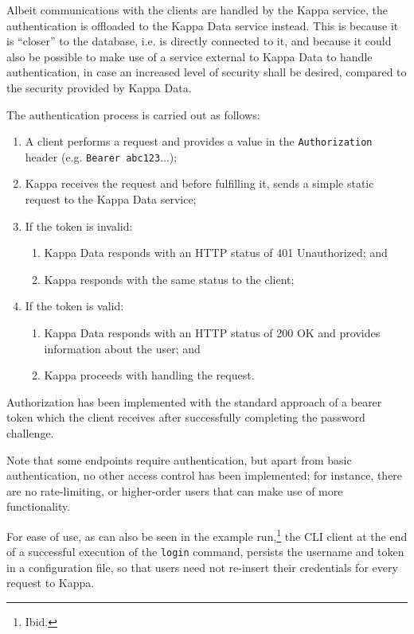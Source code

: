 \documentclass[a4paper]{ifacconf}
\begin{document}
    Albeit communications with the clients are handled by the Kappa service, the authentication is offloaded to the Kappa Data service instead.
    This is because it is ``closer'' to the database, i.e. is directly connected to it, and because it could also be possible to make use of a service external to Kappa Data to handle authentication, in case an increased level of security shall be desired, compared to the security provided by Kappa Data.
    
    The authentication process is carried out as follows:
    
    \begin{enumerate}
        \item A client performs a request and provides a value in the \texttt{Authorization} header (e.g. \texttt{Bearer abc123$\ldots$});
        \item Kappa receives the request and before fulfilling it, sends a simple static request to the Kappa Data service;
        \item If the token is invalid:
        \begin{enumerate}
            \item Kappa Data responds with an HTTP status of 401 Unauthorized; and
            \item Kappa responds with the same status to the client;
        \end{enumerate}
        \item If the token is valid:
        \begin{enumerate}
            \item Kappa Data responds with an HTTP status of 200 OK and provides information about the user; and
            \item Kappa proceeds with handling the request.
        \end{enumerate}
    \end{enumerate}

    Authorization has been implemented with the standard approach of a bearer token which the client receives after successfully completing the password challenge.
    
    Note that some endpoints require authentication, but apart from basic authentication, no other access control has been implemented; for instance, there are no rate-limiting, or higher-order users that can make use of more functionality.
    
    For ease of use, as can also be seen in the example run,\footnote{
        Ibid.
    } the CLI client at the end of a successful execution of the \texttt{login} command, persists the username and token in a configuration file, so that users need not re-insert their credentials for every request to Kappa.
    
\end{document}
